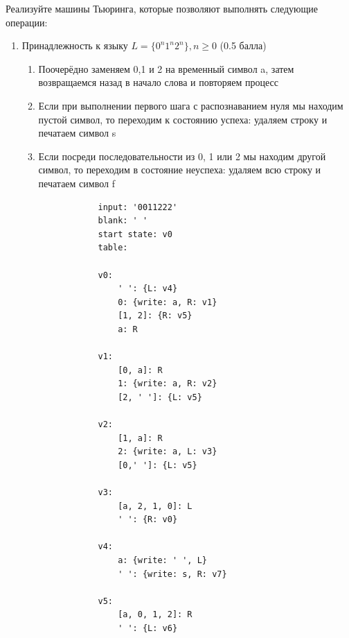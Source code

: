\documentclass{article}
\begin{document}
Реализуйте машины Тьюринга, которые позволяют выполнять следующие операции:
\begin{enumerate}
    \item Принадлежность к языку $L = \{ 0^n1^n2^n \}, n \ge 0$ (0.5 балла)
    \begin{enumerate}
        \item Поочерёдно заменяем 0,1 и 2 на временный символ a, затем возвращаемся назад в начало слова и повторяем процесс
        \item Если при выполнении первого шага с распознаванием нуля мы находим пустой символ, то переходим к состоянию успеха: удаляем строку и печатаем символ s
        \item Если посреди последовательности из 0, 1 или 2 мы находим другой символ, то переходим в 
        состояние неуспеха: удаляем всю строку и печатаем символ f
        \begin{lstlisting}
            input: '0011222'
            blank: ' '
            start state: v0
            table:

            v0:
                ' ': {L: v4}
                0: {write: a, R: v1}
                [1, 2]: {R: v5}
                a: R

            v1:
                [0, a]: R
                1: {write: a, R: v2}
                [2, ' ']: {L: v5}

            v2:
                [1, a]: R
                2: {write: a, L: v3}
                [0,' ']: {L: v5}

            v3:
                [a, 2, 1, 0]: L
                ' ': {R: v0}

            v4:
                a: {write: ' ', L}
                ' ': {write: s, R: v7}

            v5:
                [a, 0, 1, 2]: R
                ' ': {L: v6}


\end{lstlisting}
\end{enumerate}
\end{enumerate}
\end{document}
